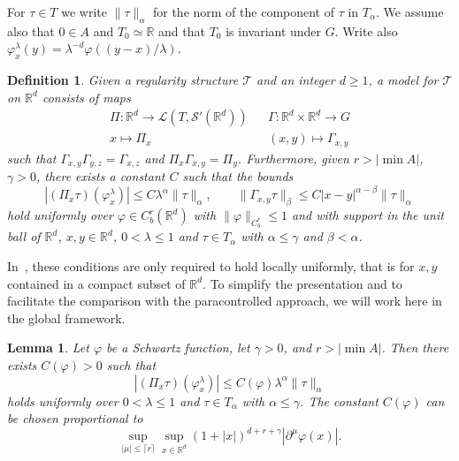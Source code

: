 \documentclass[11pt,a4paper]{article}
\newtheorem{lemma}[theorem]{Lemma}
\newtheorem{definition}[theorem]{Definition}
\theoremstyle{remark}
\newcommand{\R}{\mathbb{R}}
\renewcommand{\le}{\leqslant}
\newcommand{\CS}{\ensuremath{\mathscr{S}}}
\begin{document}
For $\tau \in T$ we write $\| \tau \|_{\alpha}$ for the norm of the component of
$\tau$ in $T_{\alpha}$. We assume also that $0 \in A$ and $T_{0} \simeq
\R$ and that $T_{0}$ is invariant under $G$. Write also
$\varphi^{\lambda}_{x} ( y ) = \lambda^{-d} \varphi ( ( y-x ) / \lambda )$.

\begin{definition}
  Given a regularity structure $\mathcal{T}$ and an integer $d \geqslant 1$, a
  model for $\mathcal{T}$ on $\R^{d}$ consists of maps
  \[ \begin{array}{ccc}
       \Pi :\R^{d} \rightarrow \mathcal{L} ( T,\CS' (
       \R^{d} ) ) &  & \Gamma :\R^{d} \times \R^{d}
       \rightarrow G\\
       x \mapsto \Pi_{x} &  & ( x,y ) \mapsto \Gamma_{x,y}
     \end{array} \]
  such that $\Gamma_{x,y} \Gamma_{y,z} = \Gamma_{x,z}$ and $\Pi_{x}
  \Gamma_{x,y} = \Pi_{y}$. Furthermore, given $r> | \min  A |$, %
  $\gamma >0$, there exists a constant $C$ such that the bounds
  \[
     | ( \Pi_{x} \tau ) ( \varphi^{\lambda}_{x} ) | \leqslant C \lambda^{\alpha} \| \tau \|_{\alpha} , \hspace{2em} \| \Gamma_{x,y} \tau  \|_{\beta} \leqslant C | x-y |^{\alpha - \beta} \| \tau \|_{\alpha}
  \]
  hold uniformly over $\varphi \in C^{r}_b ( \R^{d} )$ with $\| \varphi
  \|_{C^{r}_b} \leqslant 1$ and with support in the unit ball of $\R^{d}$,
  $x,y  \in \R^d$, $0< \lambda \leqslant 1$ and $\tau \in
  T_{\alpha}$ with $\alpha \leqslant \gamma$ and $\beta < \alpha$.
\end{definition}

In~\cite{Hairer2013a}, these conditions are only required to hold locally uniformly, that is for $x,y$ contained in a compact subset of $\R^d$. To simplify the presentation and to facilitate the comparison with the paracontrolled approach, we will work here in the global framework.

\begin{lemma}\label{lem:Pi acting on Schwartz}
   Let $\varphi$ be a Schwartz function, let $\gamma > 0$, and $r > |\min A|$. Then there exists $C(\varphi) > 0$ such that
   \[
      |(\Pi_x \tau)(\varphi^\lambda_x)| \leqslant C(\varphi) \lambda^{\alpha} \| \tau\|_\alpha
   \]
   holds uniformly over $0< \lambda \leqslant 1$ and $\tau \in T_{\alpha}$ with $\alpha \leqslant \gamma$. The constant $C(\varphi)$ can be chosen proportional to
   \[
      \sup_{|\mu|\le \lceil r\rceil}\sup_{x \in \R^d} (1+|x|)^{d+r+\gamma} |\partial^\mu \varphi(x)|.
   \]
\end{lemma}
\end{document}
